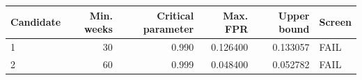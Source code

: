 \begin{tabular}{lrrrrl}
\toprule
Candidate & Min. weeks & Critical parameter & Max. FPR & Upper bound & Screen \\
\midrule
1 & 30 & 0.990 & 0.126400 & 0.133057 & FAIL \\
2 & 60 & 0.999 & 0.048400 & 0.052782 & FAIL \\
\bottomrule
\end{tabular}
